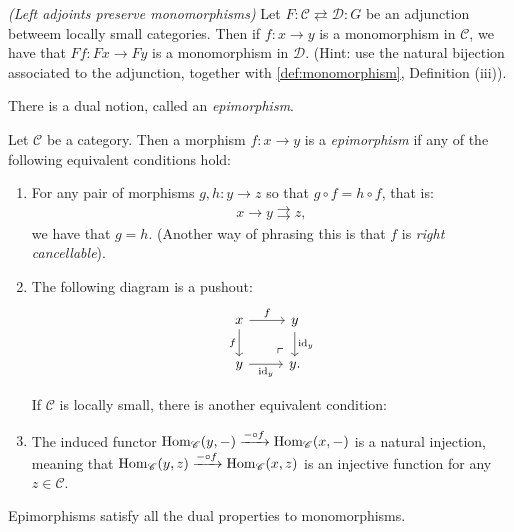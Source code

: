 \begin{exercise}\label{exer:left-adjoints-preserve-monomorphisms} \textit{(Left adjoints preserve monomorphisms)} Let $F: \mathscr{C} \rightleftarrows \mathscr{D} : G$ be an adjunction betweem locally small categories. Then if $f: x\to y$ is a monomorphism in $\mathscr{C}$, we have that $Ff : Fx \to Fy$ is a monomorphism in $\mathscr{D}$. (Hint: use the natural bijection associated to the adjunction, together with \autoref{def:monomorphism}, Definition (iii)).
\end{exercise}

There is a dual notion, called an \textit{epimorphism}.

\begin{definition}\label{def:epimorphism} Let $\mathscr{C}$ be a category. Then a morphism $f: x \to y$ is a \textit{epimorphism} if any of the following equivalent conditions hold:
\begin{enumerate}
    \item For any pair of morphisms $g,h : y \to z$ so that $g\circ f = h\circ f$, that is:
    \begin{align*}
         x \to y \rightrightarrows z,
    \end{align*}
    we have that $g = h$. (Another way of phrasing this is that $f$ is \textit{right cancellable}).

    \item The following diagram is a pushout:
\[ \begin{tikzcd}
    x\rar["f" above]\dar["f" left] & y\dar["\id_y" right]\\
    y\rar["\id_y" below] & y\po.
\end{tikzcd} \]

If $\mathscr{C}$ is locally small, there is another equivalent condition:
\end{enumerate}


\begin{enumerate}
\setcounter{enumi}{2}
    \item The induced functor $\textup{Hom}_\mathscr{C}(y,-) \xrightarrow{-\circ f} \textup{Hom}_\mathscr{C}(x,-)$ is a natural injection, meaning that $\textup{Hom}_\mathscr{C}(y,z) \xrightarrow{-\circ f} \textup{Hom}_\mathscr{C}(x,z)$ is an injective function for any $z\in \mathscr{C}$.
\end{enumerate}
\end{definition}

Epimorphisms satisfy all the dual properties to monomorphisms.

